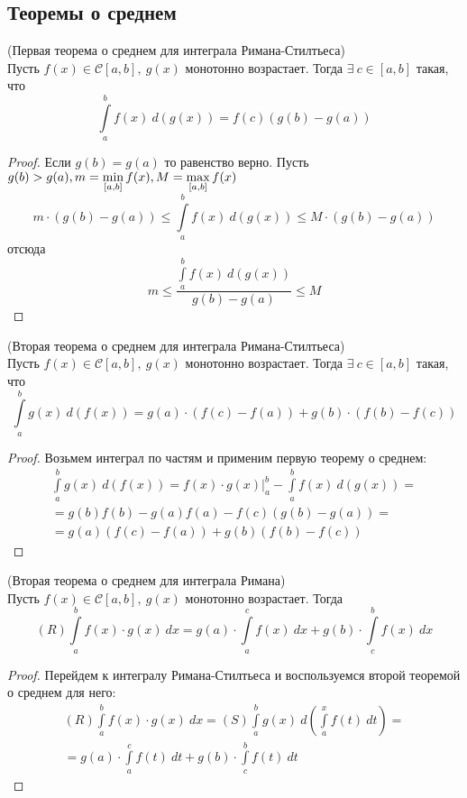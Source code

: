 \subsection{Теоремы о среднем}
\begin{theorem}
    (Первая теорема о среднем для интеграла Римана-Стилтьеса)\\ 
    Пусть $f(x)\in \mathcal{C}[a,b],\ g(x)$ монотонно возрастает. Тогда $\exists\ c\in [a,b]$ такая, что
    \[\int\limits_{a}^{b}f(x)\ d(g(x))=f(c)(g(b)-g(a))\]
\end{theorem} 
\begin{proof}
    Если $g(b)=g(a)$ то равенство верно.
    Пусть $g(b)>g(a),\\ m=\min\limits_{[a,b]} f(x), M=\max\limits_{[a,b]} f(x)$
    \[m\cdot(g(b)-g(a))\leq\int\limits_{a}^{b}f(x)\ d(g(x))\leq M\cdot(g(b)-g(a))\]
    отсюда
    \[m\leq \frac{\int\limits_{a}^{b}f(x)\ d(g(x))}{g(b)- g(a)}\leq M\]
\end{proof} 
\begin{theorem}
    (Вторая теорема о среднем для интеграла Римана-Стилтьеса)\\
    Пусть $f(x)\in \mathcal{C}[a,b],\ g(x)$ монотонно возрастает. Тогда $\exists\ c\in [a,b]$ такая, что
    \[\int\limits_{a}^{b}g(x)\ d(f(x))=g(a)\cdot(f(c)-f(a))+g(b)\cdot (f(b)-f(c))\]
\end{theorem} 
\begin{proof} Возьмем интеграл по частям и применим первую теорему о среднем:
    \begin{multline*}
        \int\limits_{a}^{b}g(x)\ d(f(x))=f(x)\cdot g(x)|^b_a-\int\limits_{a}^{b}f(x)\ d(g(x))=\\=
        g(b)f(b)-g(a)f(a)-f(c)(g(b)-g(a))=\\
        =g(a)(f(c)-f(a))+g(b)(f(b)-f(c))
    \end{multline*}
\end{proof} 
\begin{consequense}
    (Вторая теорема о среднем для интеграла Римана)\\
    Пусть $f(x)\in \mathcal{C}[a,b],\ g(x)$ монотонно возрастает. Тогда
    \[(R)\int\limits_{a}^{b}f(x)\cdot g(x)\ dx=g(a)\cdot \int\limits_{a}^{c}f(x)\ dx+g(b)\cdot \int\limits_{c}^{b}f(x)\ dx\]
\end{consequense} 
\begin{proof} Перейдем к интегралу Римана-Стилтьеса и воспользуемся второй теоремой о среднем для него:
    \begin{multline*}
        (R)\int\limits_{a}^{b}f(x)\cdot g(x)\ dx=(S) \int\limits_{a}^{b}g(x)\ d\left(\int\limits_{a}^{x}f(t)\ dt\right)=\\
        =g(a)\cdot \int\limits_{a}^{c}f(t)\ dt+g(b)\cdot \int\limits_{c}^{b}f(t)\ dt
    \end{multline*}
\end{proof} 